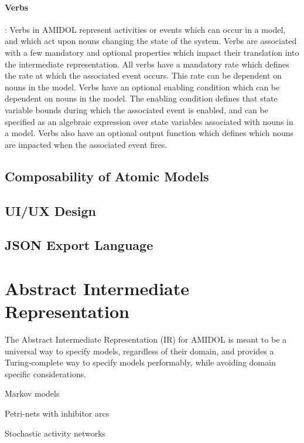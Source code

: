 \documentclass[11pt]{article}
\newcommand{\amidol}{\textsc{AMIDOL}}
\begin{document}
\paragraph{Verbs}: Verbs in \amidol{} represent activities or events which can occur in a model, and which act upon nouns changing the state of the system.  Verbs are associated with a few mandatory and optional properties which impact their translation into the intermediate representation.  All verbs have a mandatory rate which defines the rate at which the associated event occurs.  This rate can be dependent on nouns in the model.  Verbs have an optional enabling condition which can be dependent on nouns in the model.  The enabling condition defines that state variable bounds during which the associated event is enabled, and can be specified as an algebraic expression over state variables associated with nouns in a model.  Verbs also have an optional output function which defines which nouns are impacted when the associated event fires.

\subsection{Composability of Atomic Models}

\cite{sanders1992dependability,sanders1988construction}

\subsection{UI/UX Design}

\subsection{JSON Export Language}

\section{Abstract Intermediate Representation}

The Abstract Intermediate Representation (IR) for \amidol{} is meant to be a universal way to specify models, regardless of their domain, and provides a Turing-complete way to specify models performably, while avoiding domain specific considerations.

Markov models \cite{howard2012dynamic}

Petri-nets with inhibitor arcs \cite{chiola1993generalized}

Stochastic activity networks \cite{movaghar1985performability,sanders2000stochastic}
\end{document}

